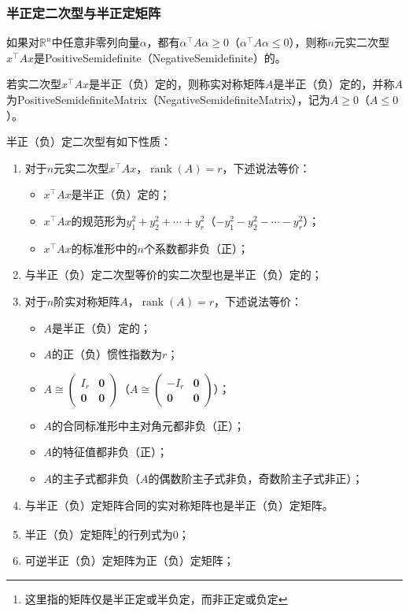 \subsubsection{半正定二次型与半正定矩阵}
\begin{definition}
	如果对$\mathbb{R}^{n}$中任意非零列向量$\alpha$，都有$\alpha^{\top}A\alpha\geqslant0$（$\alpha^{\top}A\alpha\leqslant0$），则称$n$元实二次型$x^{\top}Ax$是\gls{PositiveSemidefinite}（\gls{NegativeSemidefinite}）的。
\end{definition}
\begin{definition}
	若实二次型$x^{\top}Ax$是半正（负）定的，则称实对称矩阵$A$是半正（负）定的，并称$A$为\gls{PositiveSemidefiniteMatrix}（\gls{NegativeSemidefiniteMatrix}），记为$A\geqslant0$（$A\leqslant0$）。
\end{definition}
\begin{theorem}\label{theo:PositiveSemidefinite}
	半正（负）定二次型有如下性质：
	\begin{enumerate}
		\item 对于$n$元实二次型$x^{\top}Ax$，$\operatorname{rank}(A)=r$，下述说法等价：
		\begin{itemize}
			\item $x^{\top}Ax$是半正（负）定的；
			\item $x^{\top}Ax$的规范形为$y_1^2+y_2^2+\cdots+y_r^2$（$-y_1^2-y_2^2-\cdots-y_r^2$）；
			\item $x^{\top}Ax$的标准形中的$n$个系数都非负（正）；
		\end{itemize}
		\item 与半正（负）定二次型等价的实二次型也是半正（负）定的；
		\item 对于$n$阶实对称矩阵$A$，$\operatorname{rank}(A)=r$，下述说法等价：
		\begin{itemize}
			\item $A$是半正（负）定的；
			\item $A$的正（负）惯性指数为$r$；
			\item $A\cong
			\begin{pmatrix}
				I_r & \mathbf{0} \\
				\mathbf{0} & \mathbf{0}
			\end{pmatrix}$（$A\cong
			\begin{pmatrix}
			-I_r & \mathbf{0} \\
			\mathbf{0} & \mathbf{0}
			\end{pmatrix}$）；
			\item $A$的合同标准形中主对角元都非负（正）；
			\item $A$的特征值都非负（正）；
			\item $A$的主子式都非负（$A$的偶数阶主子式非负，奇数阶主子式非正）；
		\end{itemize}
		\item 与半正（负）定矩阵合同的实对称矩阵也是半正（负）定矩阵。
		\item 半正（负）定矩阵\footnote{这里指的矩阵仅是半正定或半负定，而非正定或负定}的行列式为$0$；
		\item 可逆半正（负）定矩阵为正（负）定矩阵；
	\end{enumerate}
\end{theorem}
